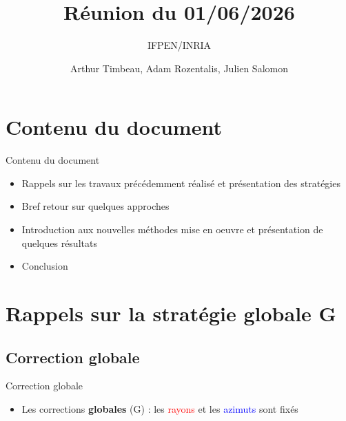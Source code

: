 \documentclass[
11pt,notheorems,hyperref={pdfauthor=whatever}
]{beamer}
\title[
]{Réunion du 01/06/2026}
\subtitle{IFPEN/INRIA}
\author[
]{
    Arthur Timbeau, 
    Adam Rozentalis,
    Julien Salomon
}
\begin{document}

\begin{frame}
  \titlepage
\end{frame}


\begin{frame}
    \tableofcontents
\end{frame}

\section{Contenu du document}

\begin{frame}{Contenu du document}
    \begin{itemize}
        \item Rappels sur les travaux précédemment réalisé et présentation des stratégies 
        \item Bref retour sur quelques approches
        \item Introduction aux nouvelles méthodes mise en oeuvre et présentation de quelques résultats
        \item Conclusion
    \end{itemize}    
\end{frame}




\section{Rappels sur la stratégie globale G}

\subsection{Correction globale}

\begin{frame}{Correction globale}
    \begin{center}
    \begin{itemize}
    \item Les corrections \textbf{globales} (G) : les \textcolor{red}{rayons} et les \textcolor{blue}{azimuts}  sont fixés
    \end{itemize}
\end{center}
\end{frame}
\end{document}

